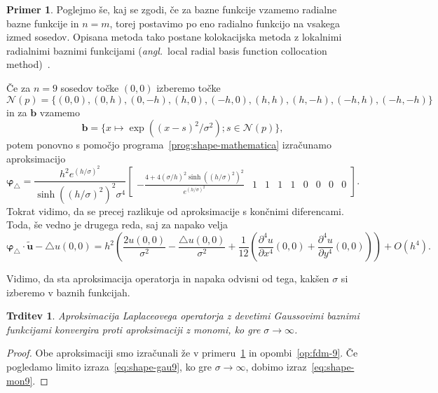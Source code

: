\documentclass[12pt,a4paper,twoside]{article}
\theoremstyle{definition} %
\newtheorem{primer}[definicija]{Primer}
\theoremstyle{plain} %
\newtheorem{trditev}[definicija]{Trditev}
\numberwithin{equation}{section}
\newcommand{\Nc}{\mathcal{N}}
\newcommand{\lap}{\triangle}
\renewcommand{\b}{\boldsymbol}
\renewcommand{\phi}{\varphi}
\newcommand{\dpar}[2]{\ensuremath{\frac{\partial #1}{\partial #2}}}
\newcommand{\ang}[1]{(\hspace{-1.5px}\textit{angl.}\ #1)}
\begin{document}
\begin{primer}
\label{prim:rbf}
Poglejmo še, kaj se zgodi, če za bazne funkcije vzamemo radialne bazne funkcije in $n = m$, torej
postavimo po eno radialno funkcijo na vsakega izmed sosedov. Opisana metoda tako postane
kolokacijska metoda z lokalnimi radialnimi baznimi funkcijami \ang{local radial basis function
collocation method}~\cite{kosec2011h}.

Če za $n = 9$ sosedov točke $(0, 0)$ izberemo točke
\small
\begin{equation}
  \Nc(p) = \{  (0, 0), (0, h), (0, -h), (h, 0), (-h, 0), (h, h), (h, -h), (-h, h), (-h, -h)\}
\end{equation}
\normalsize
in za $\b b$ vzamemo
\begin{equation}
  \b b = \{ x\mapsto \exp((x-s)^2/\sigma^2); s \in \Nc(p)\},
\end{equation}
potem ponovno s pomočjo programa~\ref{prog:shape-mathematica} izračunamo aproksimacijo
\begin{equation}
  \b\phi_\lap =\textstyle \frac{h^2 e^{(h/\sigma)^2}}{\sinh((h/\sigma)^2)^2 \sigma^4}
\begin{bmatrix}
  -\frac{4 + 4(\sigma/h)^2  \sinh((h/\sigma)^2)^2 }{e^{(h/\sigma)^2}} & 1 & 1 & 1 & 1 & 0 & 0 & 0 & 0
 \end{bmatrix}.
  \label{eq:shape-gau9}
\end{equation}
Tokrat vidimo, da se precej razlikuje od aproksimacije s končnimi diferencami.
Toda, še vedno je drugega reda, saj za napako velja
\begin{equation}
  \b \phi_\lap\!\cdot \b{\tilde{u}} - \lap u(0, 0) = \textstyle
  h^2\left(\frac{2u(0, 0)}{\sigma^2} - \frac{\lap u(0, 0)}{\sigma^2} +
  \frac{1}{12}\left( \dpar{^4u}{x^4}(0, 0) + \dpar{^4u}{y^4}(0, 0) \right)\right)
  + O(h^4).
\end{equation}
\end{primer}

Vidimo, da sta aproksimacija operatorja in napaka odvisni od tega, kakšen
$\sigma$ si izberemo v baznih funkcijah.
\begin{trditev}
  \label{trd:rbf-konv-k-mon}
  Aproksimacija Laplaceovega operatorja z devetimi Gaussovimi baznimi funkcijami
  konvergira proti aproksimaciji z monomi, ko gre $\sigma \to \infty$.
\end{trditev}
\begin{proof}
  Obe aproksimaciji smo izračunali že v primeru~\ref{prim:rbf} in
  opombi~\ref{op:fdm-9}. Če pogledamo limito izraza~\eqref{eq:shape-gau9},
  ko gre $\sigma \to \infty$, dobimo izraz~\eqref{eq:shape-mon9}.
\end{proof}
\end{document}
